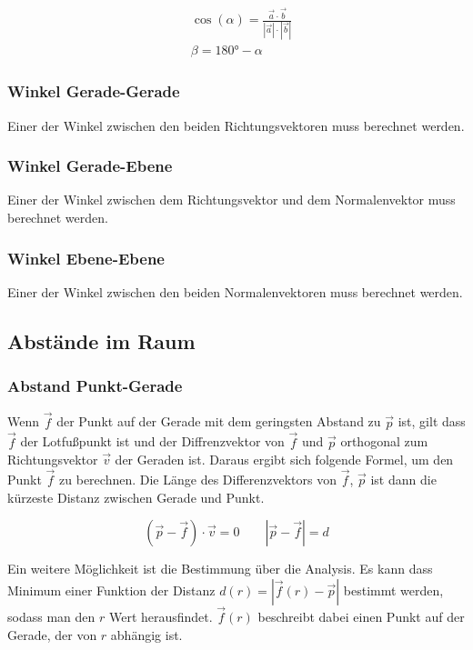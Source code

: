 \begin{align*}
    & \cos (\alpha) = \frac{\vec{a} \cdot \vec{b}}{|\vec{a}| \cdot |\vec{b}|} \\
    & \beta = 180° - \alpha
\end{align*}

\subsubsection*{Winkel Gerade-Gerade}

Einer der Winkel zwischen den beiden Richtungsvektoren muss berechnet werden.

\subsubsection*{Winkel Gerade-Ebene}

Einer der Winkel zwischen dem Richtungsvektor und dem Normalenvektor muss berechnet werden.

\subsubsection*{Winkel Ebene-Ebene}

Einer der Winkel zwischen den beiden Normalenvektoren muss berechnet werden.

\subsection{Abstände im Raum}

\subsubsection{Abstand Punkt-Gerade}

Wenn $\vec{f}$ der Punkt auf der Gerade mit dem geringsten Abstand zu $\vec{p}$ ist,
gilt dass $\vec{f}$ der Lotfußpunkt ist und der Diffrenzvektor von $\vec{f}$ und $\vec{p}$
orthogonal zum Richtungsvektor $\vec{v}$ der Geraden ist. Daraus ergibt sich folgende
Formel, um den Punkt $\vec{f}$ zu berechnen. Die Länge des Differenzvektors von $\vec{f}$,
$\vec{p}$ ist dann die kürzeste Distanz zwischen Gerade und Punkt.

\begin{equation*}
    (\vec{p} - \vec{f}) \cdot \vec{v} = 0
    \qquad |\vec{p} - \vec{f}| = d
\end{equation*}

Ein weitere Möglichkeit ist die Bestimmung über die Analysis. Es kann dass Minimum
einer Funktion der Distanz $d(r) = |\vec{f}(r) - \vec{p}|$ bestimmt werden,
sodass man den $r$ Wert herausfindet.
$\vec{f}(r)$ beschreibt dabei einen Punkt auf der Gerade, der von $r$ abhängig ist.

